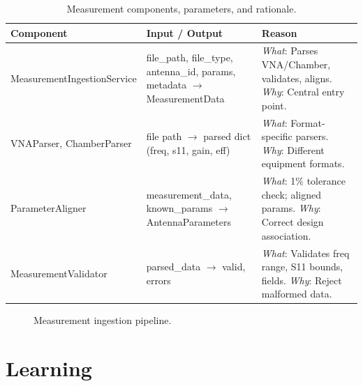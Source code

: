\documentclass[11pt,a4paper]{article}
\begin{document}
\begin{table}[htbp]
\centering
\small
\begin{tabularx}{\textwidth}{@{}lXX@{}}
\toprule
\textbf{Component} & \textbf{Input / Output} & \textbf{Reason} \\
\midrule
MeasurementIngestionService & file\_path, file\_type, antenna\_id, params, metadata $\to$ MeasurementData & \emph{What}: Parses VNA/Chamber, validates, aligns. \emph{Why}: Central entry point. \\
\addlinespace
VNAParser, ChamberParser & file path $\to$ parsed dict (freq, s11, gain, eff) & \emph{What}: Format-specific parsers. \emph{Why}: Different equipment formats. \\
\addlinespace
ParameterAligner & measurement\_data, known\_params $\to$ AntennaParameters & \emph{What}: 1\% tolerance check; aligned params. \emph{Why}: Correct design association. \\
\addlinespace
MeasurementValidator & parsed\_data $\to$ valid, errors & \emph{What}: Validates freq range, S11 bounds, fields. \emph{Why}: Reject malformed data. \\
\bottomrule
\end{tabularx}
\caption{Measurement components, parameters, and rationale.}
\end{table}

\begin{figure}[htbp]
\centering
{}
\caption{Measurement ingestion pipeline.}
\end{figure}

\section{Learning}
\end{document}
